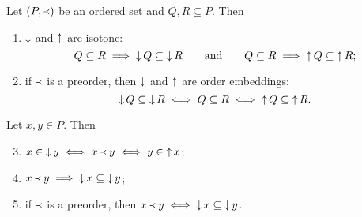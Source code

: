 \begin{lemma} \label{lemma:upDownsetInclusion}
Let $\left( P,\Yleft \right)$ be an ordered set and $Q,R\subseteq P$. Then
\begin{enumerate}
\item $\mathop{\downarrow}$ and $\mathop{\uparrow}$ are isotone:
\[Q \subseteq R \implies \mathop{\downarrow} Q \subseteq \mathop{\downarrow} R\qquad\text{and}\qquad Q \subseteq R \implies \mathop{\uparrow} Q \subseteq \mathop{\uparrow} R; \]
\item if $\Yleft$ is a preorder, then $\mathop{\downarrow}$ and $\mathop{\uparrow}$ are order embeddings:
\[ \mathop{\downarrow} Q \subseteq \mathop{\downarrow} R \iff Q \subseteq R \iff \mathop{\uparrow} Q \subseteq \mathop{\uparrow} R. \]
\end{enumerate}
Let $x, y \in P$. Then
\begin{enumerate} \setcounter{enumi}{2}
\item $x\in \mathop{\downarrow} y \iff x\Yleft y \iff y \in \mathop{\uparrow} x$;
\item $x\Yleft y \implies \mathop{\downarrow} x \subseteq \mathop{\downarrow} y$;
\item if $\Yleft$ is a preorder, then $x\Yleft y \iff \mathop{\downarrow} x \subseteq \mathop{\downarrow} y$.
\end{enumerate}
\end{lemma}


